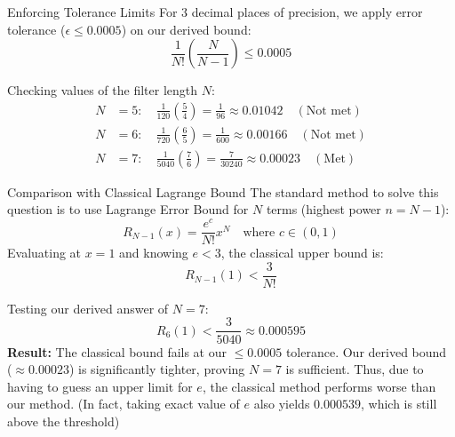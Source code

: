 \documentclass{beamer}
\numberwithin{equation}{section}
\begin{document}
\begin{frame}{Enforcing Tolerance Limits}
For 3 decimal places of precision, we apply error tolerance ($\epsilon \le 0.0005$) on our derived bound:
\begin{equation}
    \frac{1}{N!} \left( \frac{N}{N-1} \right) \le 0.0005
\end{equation}

Checking values of the filter length $N$:
\begin{align}
    N &= 5: \quad \frac{1}{120} \left( \frac{5}{4} \right) = \frac{1}{96} \approx 0.01042 \quad (\text{Not met}) \\[10pt]
    N &= 6: \quad \frac{1}{720} \left( \frac{6}{5} \right) = \frac{1}{600} \approx 0.00166 \quad (\text{Not met}) \\[10pt]
    N &= 7: \quad \frac{1}{5040} \left( \frac{7}{6} \right) = \frac{7}{30240} \approx 0.00023 \quad (\text{Met})
\end{align}
\end{frame}
\begin{frame}{Comparison with Classical Lagrange Bound}
The standard method to solve this question is to use Lagrange Error Bound for $N$ terms (highest power $n = N-1$):
\begin{equation}
    R_{N-1}(x) = \frac{e^c}{N!} x^N \quad \text{where } c \in (0,1)
\end{equation}
Evaluating at $x=1$ and knowing $e < 3$, the classical upper bound is:
\begin{equation}
    R_{N-1}(1) < \frac{3}{N!}
\end{equation}

Testing our derived answer of $N=7$:
\begin{equation}
    R_6(1) < \frac{3}{5040} \approx 0.000595
\end{equation}
\textbf{Result:} The classical bound fails at our $\le 0.0005$ tolerance. Our derived bound ($\approx 0.00023$) is significantly tighter, proving $N=7$ is sufficient. Thus, due to having to guess an upper limit for $e$, the classical method performs worse than our method. (In fact, taking exact value of $e$ also yields $0.000539$, which is still above the threshold)
\end{frame}
\end{document}

